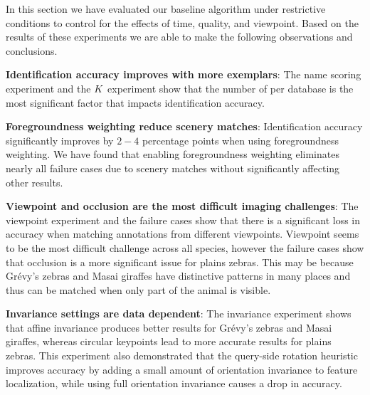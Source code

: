         In this section we have evaluated our baseline algorithm under restrictive conditions to control for the
          effects of time, quality, and viewpoint.
        Based on the results of these experiments we are able to make the following observations and conclusions.
        \begin{itemln}

            \item \textbf{Identification accuracy improves with more exemplars}:
            The name scoring experiment and the $K$ experiment show that the number of \exemplars{} per database
              \name{} is the most significant factor that impacts identification accuracy.

            \item \textbf{Foregroundness weighting reduce scenery matches}:
            Identification accuracy significantly improves by $2-4$ percentage points when using foregroundness
              weighting.
            We have found that enabling foregroundness weighting eliminates nearly all failure cases due to
              scenery matches without significantly affecting other results.

            \item \textbf{Viewpoint and occlusion are the most difficult imaging challenges}:
            The viewpoint experiment and the failure cases show that there is a significant loss in accuracy when
              matching annotations from different viewpoints.
            Viewpoint seems to be the most difficult challenge across all species, however the failure cases show
              that occlusion is a more significant issue for plains zebras.
            This may be because Grévy's zebras and Masai giraffes have distinctive patterns in many places and
              thus can be matched when only part of the animal is visible.

            \item \textbf{Invariance settings are data dependent}:
                The invariance experiment shows that
                affine invariance produces better results for Grévy's zebras and Masai giraffes, whereas circular
                  keypoints lead to more accurate results for plains zebras.
                This experiment also demonstrated that the query-side rotation heuristic improves accuracy by
                  adding a small amount of orientation invariance to feature localization, while using full
                  orientation invariance causes a drop in accuracy.


\end{itemln}
